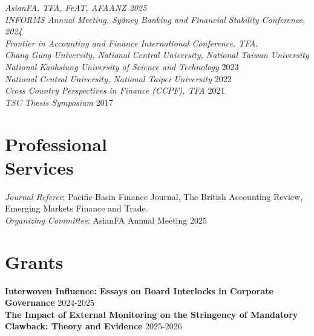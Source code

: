 \documentclass[margin]{res} %
\begin{document}
\begin{resume}
{\sl AsianFA, TFA, FeAT, AFAANZ \hfill 2025} \\
{\sl INFORMS Annual Meeting, Sydney Banking and Financial Stability Conference, \hfill 2024 \\
Frontier in Accounting and Finance International Conference, TFA, \\
Chang Gung University, National Central University, National Taiwan University}  \\
{\sl National Kaohsiung University of Science and Technology} \hfill 2023 \\
{\sl National Central University, National Taipei University} \hfill 2022 \\
{\sl Cross Country Perspectives in Finance (CCPF), TFA} \hfill 2021 \\
{\sl TSC Thesis Symposium} \hfill 2017
\section{Professional \\ Services}

\textit{Journal Referee}: Pacific-Basin Finance Journal, The British Accounting Review, \\ 
Emerging Markets Finance and Trade. \\
\textit{Organizing Committee}: AsianFA Annual Meeting 2025

\section{Grants}

\textbf{Interwoven Influence: Essays on Board Interlocks in Corporate Governance} \hfill 2024-2025 \\
\textbf{The Impact of External Monitoring on the Stringency of Mandatory Clawback: Theory and Evidence} \hfill 2025-2026 \\



\end{resume}
\end{document}
